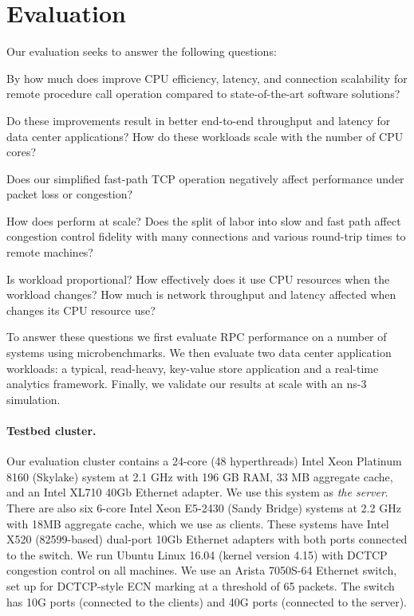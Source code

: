\section{Evaluation}\label{sec:eval}

Our evaluation seeks to answer the following questions:

\squishlist
\item By how much does \rmttcp improve CPU efficiency, latency, and
  connection scalability for remote procedure call operation compared
  to state-of-the-art software solutions?

\item Do these improvements result in better end-to-end throughput
  and latency for data center applications? How do these workloads
  scale with the number of CPU cores?


\item Does our simplified fast-path TCP operation negatively affect
  performance under packet loss or congestion?

\item How does \taas perform at scale? Does the split of labor into
  slow and fast path affect congestion control fidelity with many
  connections and various round-trip times to remote machines?

\item Is \taas workload proportional? How effectively does it use CPU
  resources when the workload changes? How much is network throughput
  and latency affected when \taas changes its CPU resource use?
\squishend

\noindent
To answer these questions we first evaluate RPC performance on a
number of systems using microbenchmarks. We then evaluate two data
center application workloads: a typical, read-heavy, key-value store
application and a real-time analytics framework. Finally, we validate
our results at scale with an ns-3 simulation.

\paragraph{Testbed cluster.} Our evaluation cluster contains a 24-core
(48 hyperthreads) Intel Xeon Platinum 8160 (Skylake) system at 2.1 GHz
with 196 GB RAM, 33 MB aggregate cache, and an Intel XL710 40Gb
Ethernet adapter. We use this system as \emph{the server}. There are
also six 6-core Intel Xeon E5-2430 (Sandy Bridge) systems at 2.2 GHz
with 18MB aggregate cache, which we use as clients.
These systems have Intel X520 (82599-based)
dual-port 10Gb Ethernet adapters with both ports connected to the
switch. We run Ubuntu Linux 16.04 (kernel version 4.15) with DCTCP
congestion control on all machines. We use an Arista 7050S-64 Ethernet
switch, set up for DCTCP-style ECN marking at a threshold of 65
packets. The switch has 10G ports (connected to the clients) and 40G
ports (connected to the server).

